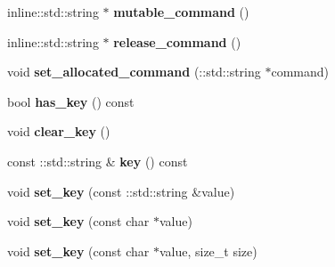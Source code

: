 \begin{DoxyCompactItemize}
\item 
\hypertarget{classmessaging_1_1RequestMessage_a005e89188da50a30d74180ea5a7b41de}{
inline::std::string $\ast$ {\bfseries mutable\_\-command} ()}
\label{classmessaging_1_1RequestMessage_a005e89188da50a30d74180ea5a7b41de}

\item 
\hypertarget{classmessaging_1_1RequestMessage_a7aad456a9a8603097015e349202c43cd}{
inline::std::string $\ast$ {\bfseries release\_\-command} ()}
\label{classmessaging_1_1RequestMessage_a7aad456a9a8603097015e349202c43cd}

\item 
\hypertarget{classmessaging_1_1RequestMessage_a3376222000ea73aab5aa2820f75a4739}{
void {\bfseries set\_\-allocated\_\-command} (::std::string $\ast$command)}
\label{classmessaging_1_1RequestMessage_a3376222000ea73aab5aa2820f75a4739}

\item 
\hypertarget{classmessaging_1_1RequestMessage_a186ba1c789dab9f0dcdf7871a9cd5cd8}{
bool {\bfseries has\_\-key} () const }
\label{classmessaging_1_1RequestMessage_a186ba1c789dab9f0dcdf7871a9cd5cd8}

\item 
\hypertarget{classmessaging_1_1RequestMessage_a6fa549a415f20dcb92fc994007b246dc}{
void {\bfseries clear\_\-key} ()}
\label{classmessaging_1_1RequestMessage_a6fa549a415f20dcb92fc994007b246dc}

\item 
\hypertarget{classmessaging_1_1RequestMessage_af357f48e8e3ae4f2f34de028d50ebce6}{
const ::std::string \& {\bfseries key} () const }
\label{classmessaging_1_1RequestMessage_af357f48e8e3ae4f2f34de028d50ebce6}

\item 
\hypertarget{classmessaging_1_1RequestMessage_ab31cbe5ef09328c10198709b386bb09e}{
void {\bfseries set\_\-key} (const ::std::string \&value)}
\label{classmessaging_1_1RequestMessage_ab31cbe5ef09328c10198709b386bb09e}

\item 
\hypertarget{classmessaging_1_1RequestMessage_ad44fade1f8c326aa3660b307a3ad20f8}{
void {\bfseries set\_\-key} (const char $\ast$value)}
\label{classmessaging_1_1RequestMessage_ad44fade1f8c326aa3660b307a3ad20f8}

\item 
\hypertarget{classmessaging_1_1RequestMessage_a88b1064ca0989d92919f4ed9da5c1c8b}{
void {\bfseries set\_\-key} (const char $\ast$value, size\_\-t size)}
\label{classmessaging_1_1RequestMessage_a88b1064ca0989d92919f4ed9da5c1c8b}


\end{DoxyCompactItemize}
